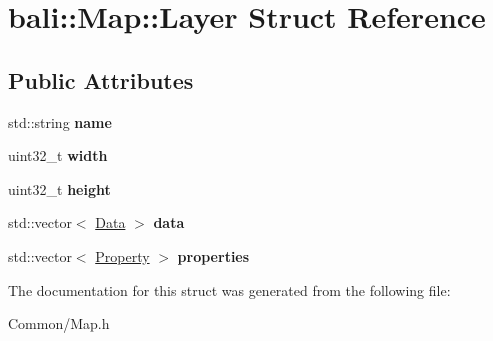 \hypertarget{structbali_1_1_map_1_1_layer}{\section{bali\-:\-:Map\-:\-:Layer Struct Reference}
\label{structbali_1_1_map_1_1_layer}
}
\subsection*{Public Attributes}
\begin{DoxyCompactItemize}
\item 
\hypertarget{structbali_1_1_map_1_1_layer_a115f3521c4a1693823eb10f1af20f503}{std\-::string {\bfseries name}}\label{structbali_1_1_map_1_1_layer_a115f3521c4a1693823eb10f1af20f503}

\item 
\hypertarget{structbali_1_1_map_1_1_layer_a6853988a392abb16d6b4ad70991ee069}{uint32\-\_\-t {\bfseries width}}\label{structbali_1_1_map_1_1_layer_a6853988a392abb16d6b4ad70991ee069}

\item 
\hypertarget{structbali_1_1_map_1_1_layer_a0eb16afeb2a3ef112015ac47bc68f057}{uint32\-\_\-t {\bfseries height}}\label{structbali_1_1_map_1_1_layer_a0eb16afeb2a3ef112015ac47bc68f057}

\item 
\hypertarget{structbali_1_1_map_1_1_layer_ab6a6d3b1e21d756987f094b91d8141a8}{std\-::vector$<$ \hyperlink{structbali_1_1_map_1_1_data}{Data} $>$ {\bfseries data}}\label{structbali_1_1_map_1_1_layer_ab6a6d3b1e21d756987f094b91d8141a8}

\item 
\hypertarget{structbali_1_1_map_1_1_layer_a2ef649da26808954e715b3bc692035e7}{std\-::vector$<$ \hyperlink{structbali_1_1_map_1_1_property}{Property} $>$ {\bfseries properties}}\label{structbali_1_1_map_1_1_layer_a2ef649da26808954e715b3bc692035e7}

\end{DoxyCompactItemize}


The documentation for this struct was generated from the following file\-:\begin{DoxyCompactItemize}
\item 
Common/Map.\-h\end{DoxyCompactItemize}
